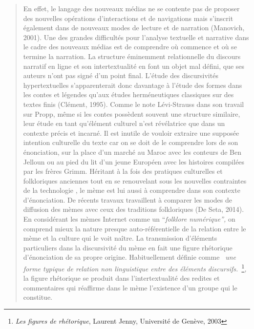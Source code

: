 \begin{quote}
En effet, le langage des nouveaux m\'edias ne se contente pas de proposer des nouvelles op\'erations d{\textquoteright}interactions et de navigations mais s{\textquoteright}inscrit \'egalement dans de nouveaux modes de lecture et de narration (Manovich, 2001). Une des grandes difficult\'es pour l{\textquoteright}analyse textuelle et narrative dans le cadre des nouveaux m\'edias est de comprendre o\`u commence et o\`u se termine la narration. La structure \'eminemment relationnelle du discours narratif en ligne et son intertextualit\'e en font un objet mal d\'efini, que ses auteurs n{\textquoteright}ont pas sign\'e d{\textquoteright}un point final. L{\textquoteright}\'etude des discursivit\'es hypertextuelles s{\textquoteright}apparenterait donc davantage \`a l{\textquoteright}\'etude des formes dans les contes et l\'egendes qu{\textquoteright}aux \'etudes herm\'eneutiques classiques sur des textes finis (Cl\'ement, 1995). Comme le note L\'evi-Strauss dans son travail sur Propp, m\^eme si les contes poss\`edent souvent une structure similaire, leur \'etude en tant qu{\textquoteright}\'el\'ement culturel n{\textquoteright}est r\'ev\'elatrice que dans un contexte pr\'ecis et incarn\'e. Il est inutile de vouloir extraire une suppos\'ee intention culturelle du texte car on se doit de le comprendre lors de son \'enonciation, sur la place d{\textquoteright}un march\'e au Maroc avec les conteurs de Ben Jelloun ou au pied du lit d{\textquoteright}un jeune Europ\'een avec les histoires compil\'ees par les fr\`eres Grimm. H\'eritant \`a la fois des pratiques culturelles et folkloriques anciennes tout en se renouvelant sous les nouvelles contraintes de la technologie \cite{Barber2008}, le m\`eme est lui aussi \`a comprendre dans son contexte d{\textquoteright}\'enonciation. De r\'ecents travaux travaillent \`a comparer les modes de diffusion des m\`emes avec ceux des traditions folkloriques (De Seta, 2014). En consid\'erant les m\`emes Internet comme un {\textquotedblleft}\textit{folklore num\'erique{\textquotedblright}, }on comprend mieux la nature presque auto-r\'ef\'erentielle de la relation entre le m\`eme et la culture qui le voit na\^itre. La transmission d{\textquoteright}\'el\'ements particuliers dans la discursivit\'e du m\`eme en fait une figure rh\'etorique d{\textquoteright}\'enonciation de sa propre origine. Habituellement d\'efinie comme \textit{{\guillemotleft}~une forme typique de relation non linguistique entre des \'el\'ements discursifs.~{\guillemotright}}\footnote{ \textit{Les figures de rh\'etorique}, Laurent Jenny, Universit\'e de Gen\`eve, 2003}\textit{, }la figure rh\'etorique se produit dans l{\textquoteright}intertextualit\'e des redites et commentaires qui r\'eaffirme dans le m\`eme l{\textquoteright}existence d{\textquoteright}un groupe qui le constitue.  

\end{quote}
